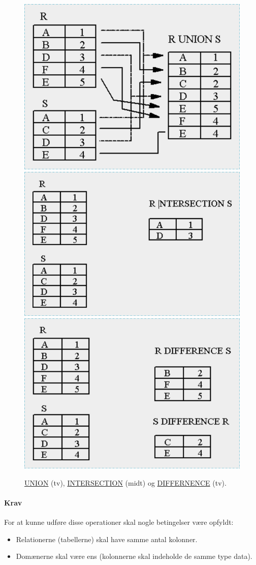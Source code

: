 \begin{figure}[H]
	\centering
	\includegraphics[width=.33\textwidth]{figs/spm6/unionexample}\hfill
	\includegraphics[width=.33\textwidth]{figs/spm6/intersectionexample}\hfill
	\includegraphics[width=.33\textwidth]{figs/spm6/differenceexample}
	
	\caption{\href{https://en.wikipedia.org/wiki/Union_(set_theory)}{UNION} (tv), \href{https://en.wikipedia.org/wiki/Intersection_(set_theory)}{INTERSECTION} (midt) og \href{https://en.wikipedia.org/wiki/Complement_(set_theory)}{DIFFERNENCE} (tv).}
	\label{fig:union_intersection_difference_example}	
\end{figure}

\paragraph{Krav}

For at kunne udføre disse operationer skal nogle betingelser være opfyldt: 

\begin{itemize}
	\item Relationerne (tabellerne) skal have samme antal kolonner.
	\item Domænerne skal være ens (kolonnerne skal indeholde de samme type data).
\end{itemize}